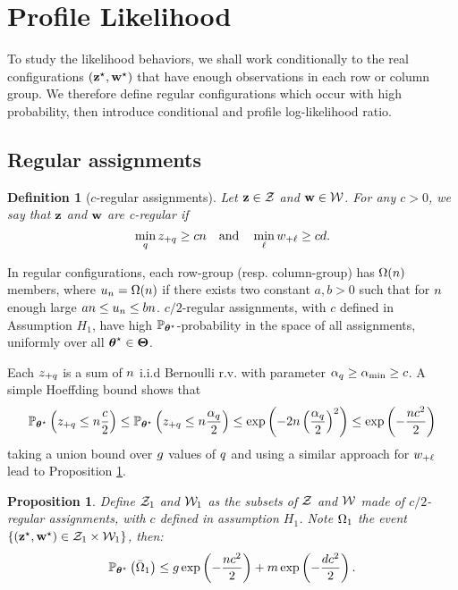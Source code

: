 \documentclass[bj]{imsart}
\numberwithin{equation}{section}
\theoremstyle{plain}
\newtheorem{dof}[thm]{Definition}
\newtheorem{proposition}[thm]{Proposition}
\theoremstyle{remark}
\begin{document}
\section{Profile Likelihood}
\label{sec:profile-likelihood}
To study the likelihood behaviors, we shall work conditionally to the real configurations $(\mathbf{z}^\star,\mathbf{w}^\star)$ that have enough observations in each row or column group. We therefore define regular configurations which occur with high probability, then introduce conditional and profile log-likelihood ratio. 
\subsection{Regular assignments}
\begin{dof}[$c$-regular assignments]
  \label{def:regular}
  Let $\mathbf{z} \in \mathcal{Z}$ and $\mathbf{w} \in \mathcal{W}$. For any $c > 0$, we say that $\mathbf{z}$ and $\mathbf{w}$ are c-\emph{regular} if
  \begin{equation}
    \label{eq:regular-configuration}
    \min_{\kk} \zsumk \geq {c\n} \quad \text{and} \quad \min_{\el} \wsuml \geq {c\dd}.
  \end{equation}
\end{dof}



In regular configurations, each row-group (resp. column-group) has $\Omega(n)$ members, where $u_n=\Omega(n)$ if there exists two constant $a, b>0$ such that for $n$ enough large $an \leq u_n \leq bn$. $c/2$-regular assignments, with $c$ defined in Assumption $H_1$, have high  $\mathbb{P}_{\boldsymbol{\theta}^\star}$-probability in the space of all assignments, uniformly over all $\boldsymbol{\theta}^\star \in \boldsymbol{\Theta}$. 

Each $z_{+q}$ is a sum of $n$ i.i.d Bernoulli r.v. with parameter $\alpha_q \geq \alpha_{\min} \geq c$. A simple Hoeffding bound shows that
\begin{equation*}
  \Prob_{\bthetas}\left( \zsumk \leq \n \frac{c}{2} \right)
  \leq
  \Prob_{\bthetas}\left( \zsumk \leq \n \frac{\pik}{2} \right)
  \leq
  \exp\left( - 2\n\left(\frac{\pik}{2}\right)^2 \right)
  \leq
  \exp\left( - \frac{\n c^2}{2} \right)
\end{equation*}
taking a union bound over $g$ values of $q$ and using a similar approach for $w_{+\ell}$ lead to Proposition \ref{cor:prob-regular-configurations-star}.
\begin{proposition}
  \label{cor:prob-regular-configurations-star}
  Define $\mathcal{Z}_1$ and $\mathcal{W}_1$ as the subsets of $\mathcal{Z}$ and $\mathcal{W}$
  made of $c/2$-regular assignments, with $c$ defined in assumption $H_1$. Note $\Omega_1$ the event $\{ (\mathbf{z}^\star, \mathbf{w}^\star)
  \in \mathcal{Z}_1 \times \mathcal{W}_1 \}$, then:
  \begin{equation*}
    \Prob_{\bthetas}\left( \bar{\Om}_1 \right) \leq \g \exp\left( -\frac{\n c^2}{2}\right)+ \m \exp\left( -\frac{\dd c^2}{2}\right).
  \end{equation*}
\end{proposition}
\end{document}
